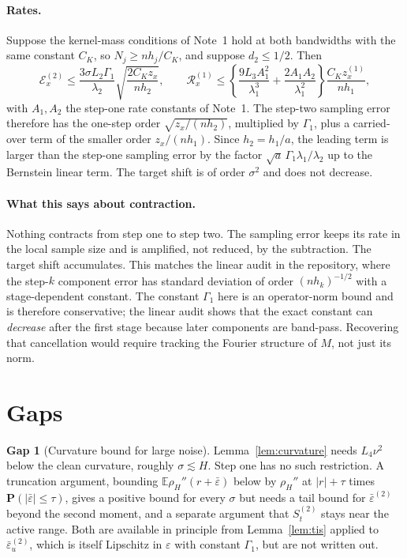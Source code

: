 \documentclass[11pt]{article}
\newcommand{\E}{\mathbb{E}}
\newcommand{\Pp}{\mathbf{P}}
\newcommand{\IMFs}{S}
\newcommand{\Mop}{M}
\theoremstyle{definition}
\newtheorem*{gap}{Gap}
\begin{document}
\paragraph{Rates.}
Suppose the kernel-mass conditions of Note~1 hold at both bandwidths with
the same constant \(C_K\), so \(N_j\geq nh_j/C_K\), and suppose
\(d_2\leq1/2\).  Then
\begin{equation}
  \mathcal E^{(2)}_x
    \leq\frac{3\sigma L_2\Gamma_1}{\lambda_2}\sqrt{\frac{2C_Kz_x}{nh_2}},
  \qquad
  \mathcal R^{(1)}_x
    \leq\left\{\frac{9L_3A_1^2}{\lambda_1^3}
          +\frac{2A_1A_2}{\lambda_1^2}\right\}\frac{C_Kz^{(1)}_x}{nh_1},
  \label{eq:step2-rates}
\end{equation}
with \(A_1,A_2\) the step-one rate constants of Note~1.  The step-two
sampling error therefore has the one-step order \(\sqrt{z_x/(nh_2)}\),
multiplied by \(\Gamma_1\), plus a carried-over term of the smaller order
\(z_x/(nh_1)\).  Since \(h_2=h_1/a\), the leading term is larger than the
step-one sampling error by the factor \(\sqrt a\,\Gamma_1\lambda_1/\lambda_2\)
up to the Bernstein linear term.  The target shift is of order \(\sigma^2\)
and does not decrease.

\paragraph{What this says about contraction.}
Nothing contracts from step one to step two.  The sampling error keeps its
rate in the local sample size and is amplified, not reduced, by the
subtraction.  The target shift accumulates.  This matches the linear audit
in the repository, where the step-\(k\) component error has standard
deviation of order \((nh_k)^{-1/2}\) with a stage-dependent constant.  The
constant \(\Gamma_1\) here is an operator-norm bound and is therefore
conservative; the linear audit shows that the exact constant can
\emph{decrease} after the first stage because later components are
band-pass.  Recovering that cancellation would require tracking the Fourier
structure of \(\Mop\), not just its norm.

\section{Gaps}\label{sec:gaps}

\begin{gap}[Curvature bound for large noise]
Lemma~\ref{lem:curvature} needs \(L_4\nu^2\) below the clean curvature,
roughly \(\sigma\lesssim H\).  Step one has no such restriction.  A
truncation argument, bounding \(\E\rho_H''(r+\bar\varepsilon)\) below by
\(\rho_H''\) at \(|r|+\tau\) times \(\Pp(|\bar\varepsilon|\leq\tau)\), gives
a positive bound for every \(\sigma\) but needs a tail bound for
\(\bar\varepsilon^{(2)}\) beyond the second moment, and a separate argument
that \(\IMFs^{(2)}_t\) stays near the active range.  Both are available in
principle from Lemma~\ref{lem:tis} applied to \(\bar\varepsilon^{(2)}_u\),
which is itself Lipschitz in \(\varepsilon\) with constant \(\Gamma_1\),
but are not written out.
\end{gap}
\end{document}

